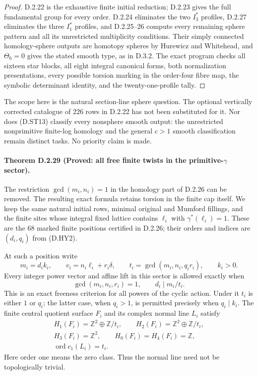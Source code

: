 \begin{proof}
D.2.22 is the exhaustive finite initial reduction; D.2.23 gives
the full fundamental group for every order. D.2.24 eliminates
the two $I_3^*$ profiles, D.2.27 eliminates the three $I_1^*$
profiles, and D.2.25--26 compute every remaining sphere pattern
and all its unrestricted multiplicity conditions. Their
simply connected homology-sphere outputs are homotopy spheres
by Hurewicz and Whitehead, and $\Theta_6=0$ gives the stated
smooth type, as in D.3.2. The exact program
 checks all sixteen
star blocks, all eight integral canonical forms, both
normalization presentations, every possible torsion marking
in the order-four fibre map, the symbolic determinant identity,
and the twenty-one-profile tally.
\end{proof}

The scope here is the natural section-line sphere question.
The optional vertically corrected catalogue of $226$ rows in
D.2.22 has not been substituted for it. Nor does (D.ST13)
classify every nonsphere smooth output: the unrestricted
nonprimitive finite-log homology and the general $c>1$ smooth
classification remain distinct tasks. No priority claim is made.


\paragraph{Theorem D.2.29 (Proved: all free finite twists in the primitive-$\gamma$ sector).}
The restriction $\gcd(m_i,n_i)=1$ in the homology part of D.2.26
can be removed. The resulting exact formula retains torsion in
the finite cap itself. We keep the same natural initial rows,
minimal original and Mumford fillings, and the finite sites
whose integral fixed lattice contains $\ell_i$ with
$\gamma^*(\ell_i)=1$. These are the $68$ marked finite positions
certified in D.2.26; their orders and indices are $(d_i,q_i)$
from (D.HY2).

At such a position write
\[
 m_i=d_i k_i,\qquad v_i=n_i\ell_i+r_i\delta,\qquad
 t_i=\gcd(m_i,n_i,q_i r_i),\qquad k_i>0.
\]
Every integer power vector and affine lift in this sector is
allowed exactly when
\[
 \gcd(m_i,n_i,r_i)=1,\qquad d_i\mid m_i/t_i.                 \tag{D.UF1}
\]
This is an exact freeness criterion for all powers of the
cyclic action. Under it $t_i$ is either $1$ or $q_i$; the latter
case, when $q_i>1$, is permitted precisely when $q_i\mid k_i$.
The finite central quotient surface $F_i$ and its complex
normal line $L_i$ satisfy
\[
\begin{gathered}
 H_1(F_i)=\mathbb Z^2\oplus\mathbb Z/t_i,\qquad
 H_2(F_i)=\mathbb Z^2\oplus\mathbb Z/t_i,\\
 H_3(F_i)=\mathbb Z^2,\qquad H_0(F_i)=H_4(F_i)=\mathbb Z,\\
 \operatorname{ord}c_1(L_i)=t_i.
\end{gathered}                                               \tag{D.UF2}
\]
Here order one means the zero class. Thus the normal line need
not be topologically trivial.

